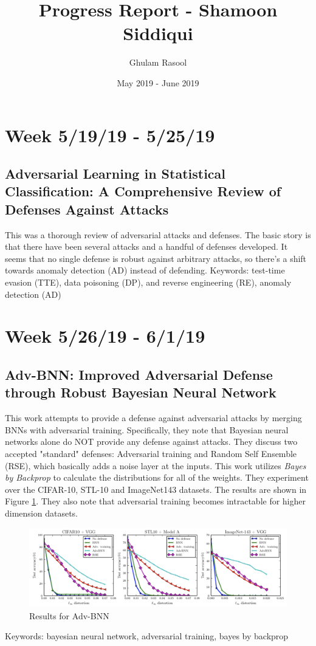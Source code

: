 \documentclass{article}
\title{Progress Report - Shamoon Siddiqui}
\author{Ghulam Rasool}
\date{May 2019 - June 2019}
\begin{document}
\maketitle

\section*{Week 5/19/19 - 5/25/19}

\subsection*{Adversarial Learning in Statistical Classification: A
Comprehensive Review of Defenses Against Attacks\cite{miller2019adversarial}}

This was a thorough review of adversarial attacks and defenses. The basic story is that there have been several attacks and a handful of defenses developed. It seems that no single defense is robust against arbitrary attacks, so there's a shift towards anomaly detection (AD) instead of defending.
\newline\newline
Keywords: test-time evasion (TTE), data poisoning (DP), and reverse engineering (RE), anomaly detection (AD)

\section*{Week 5/26/19 - 6/1/19}
\subsection*{Adv-BNN: Improved Adversarial Defense through Robust Bayesian Neural Network\cite{liu2018adv}}

This work attempts to provide a defense against adversarial attacks by merging BNNs with adversarial training. Specifically, they note that Bayesian neural networks alone do NOT provide any defense against attacks. They discuss two accepted "standard" defenses: Adversarial training and Random Self Ensemble (RSE), which basically adds a noise layer at the inputs. This work utilizes \textit{Bayes by Backprop} to calculate the distributions for all of the weights. They experiment over the CIFAR-10, STL-10 and ImageNet143 datasets. The results are shown in Figure \ref{figure1}. They also note that adversarial training becomes intractable for higher dimension datasets.
\begin{figure}
    \centering
    \includegraphics[width=1.0\textwidth]{results.png}
    \caption{Results for Adv-BNN}
    \label{figure1}
\end{figure}
\newline\newline
Keywords: bayesian neural network, adversarial training, bayes by backprop
\end{document}
